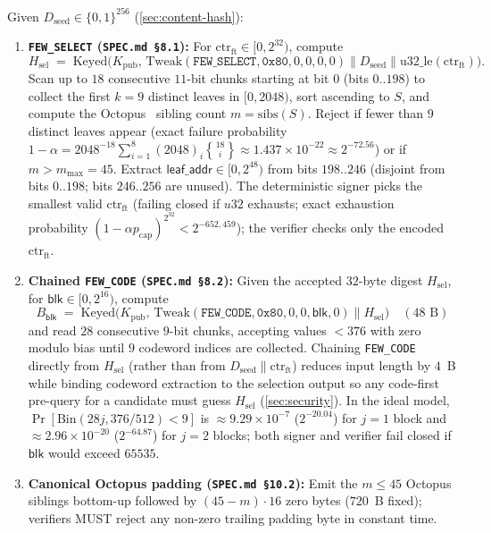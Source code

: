 \documentclass[11pt,a4paper]{article}
\theoremstyle{definition}
\theoremstyle{remark}
\newcommand{\Keyed}{\mathrm{Keyed}}
\newcommand{\Tweak}{\mathrm{Tweak}}
\newcommand{\bits}{\{0,1\}}
\begin{document}
Given $D_{\mathrm{seed}} \in \bits^{256}$ (\cref{sec:content-hash}):
\begin{enumerate}[leftmargin=1.4em,itemsep=2pt]
  \item \textbf{\texttt{FEW\_SELECT} (\texttt{SPEC.md §8.1}):} For $\mathrm{ctr}_{\mathrm{ft}} \in [0, 2^{32})$, compute
    \[
      H_{\mathrm{sel}} \;=\; \Keyed\!\big(K_{\mathrm{pub}},\, \Tweak(\mathtt{FEW\_SELECT}, \mathtt{0x80}, 0,0,0,0) \parallel D_{\mathrm{seed}} \parallel \mathrm{u32\_le}(\mathrm{ctr}_{\mathrm{ft}})\big).
    \]
    Scan up to $18$ consecutive $11$-bit chunks starting at bit $0$ (bits $0..198$) to collect the first $k = 9$ distinct leaves in $[0, 2048)$, sort ascending to $S$, and compute the Octopus~\cite{aumasson2017gravity} sibling count $m = \mathrm{sibs}(S)$. Reject if fewer than $9$ distinct leaves appear (exact failure probability $1 - \alpha = 2048^{-18}\sum_{i=1}^{8}(2048)_i \genfrac{\{}{\}}{0pt}{}{18}{i} \approx 1.437 \times 10^{-22} \approx 2^{-72.56}$) or if $m > m_{\max} = 45$. Extract $\mathsf{leaf\_addr} \in [0, 2^{48})$ from bits $198..246$ (disjoint from bits $0..198$; bits $246..256$ are unused). The deterministic signer picks the smallest valid $\mathrm{ctr}_{\mathrm{ft}}$ (failing closed if $u32$ exhausts; exact exhaustion probability $(1 - \alpha p_{\mathrm{cap}})^{2^{32}} < 2^{-652{,}459}$); the verifier checks only the encoded $\mathrm{ctr}_{\mathrm{ft}}$.
  \item \textbf{Chained \texttt{FEW\_CODE} (\texttt{SPEC.md §8.2}):} Given the accepted $32$-byte digest $H_{\mathrm{sel}}$, for $\mathsf{blk} \in [0, 2^{16})$, compute
    \[
      B_{\mathsf{blk}} \;=\; \Keyed\!\big(K_{\mathrm{pub}},\, \Tweak(\mathtt{FEW\_CODE}, \mathtt{0x80}, 0,0,\mathsf{blk}, 0) \parallel H_{\mathrm{sel}}\big) \quad (48\text{ B})
    \]
    and read $28$ consecutive $9$-bit chunks, accepting values $< 376$ with zero modulo bias until $9$ codeword indices are collected. Chaining \texttt{FEW\_CODE} directly from $H_{\mathrm{sel}}$ (rather than from $D_{\mathrm{seed}} \parallel \mathrm{ctr}_{\mathrm{ft}}$) reduces input length by $4$~B while binding codeword extraction to the selection output so any code-first pre-query for a candidate must guess $H_{\mathrm{sel}}$ (\cref{sec:security}). In the ideal model, $\Pr[\mathrm{Bin}(28j, 376/512) < 9]$ is $\approx 9.29 \times 10^{-7}$ ($2^{-20.04}$) for $j = 1$ block and $\approx 2.96 \times 10^{-20}$ ($2^{-64.87}$) for $j = 2$ blocks; both signer and verifier fail closed if $\mathsf{blk}$ would exceed $65535$.
  \item \textbf{Canonical Octopus padding (\texttt{SPEC.md §10.2}):} Emit the $m \le 45$ Octopus siblings bottom-up followed by $(45 - m) \cdot 16$ zero bytes ($720$~B fixed); verifiers MUST reject any non-zero trailing padding byte in constant time.
\end{enumerate}
\end{document}
